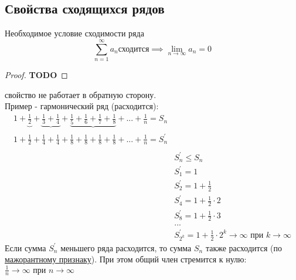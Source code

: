 \subsection{Свойства сходящихся рядов}
\begin{sv}
    \label{sv:neob}
    Необходимое условие сходимости ряда
    \begin{equation}
        \sum_{n=1}^{\infty} a_{n} \text{сходится}
        \implies \lim_{n\to\infty} a_{n} = 0
    \end{equation}

    \begin{proof}
        \color{YellowOrange}\textbf{TODO}
    \end{proof}

    \begin{remark}
        свойство не работает в обратную сторону. \\
        Пример - гармонический ряд (расходится): 
        \begin{equation}
            \begin{align*}
                1 
                + \underbrace{\frac{1}{2}}_{\text{}} 
                + \underbrace{\frac{1}{3} + \frac{1}{4}}_{\text{}} 
                + \underbrace{\frac{1}{5} + \frac{1}{6} + \frac{1}{7} + \frac{1}{8}}_{\text{}}
                + ... 
                + \frac{1}{n}
                = S_{n}
                \\
                1
                + \frac{1}{2}
                + \frac{1}{4} + \frac{1}{4}
                + \frac{1}{8} + \frac{1}{8} + \frac{1}{8} + \frac{1}{8}
                + ... 
                + \frac{1}{n}
                = S^{'}_{n}
                \\
                \\
                &S^{'}_{n} \leq S_{n}\\
                &S^{'}_{1} = 1\\
                &S^{'}_{2} = 1 + \frac{1}{2}\\
                &S^{'}_{4} = 1 + \frac{1}{2}\cdot 2\\
                &S^{'}_{8} = 1 + \frac{1}{2}\cdot 3\\
                &...
                \\
                &S^{'}_{2^{k}} = 1 + \frac{1}{2}\cdot 2^{k} \to\infty \text{ при } k\to\infty
            \end{align*}
        \end{equation}
        Если сумма \(S^{'}_{n}\) меньшего ряда расходится, то сумма \(S_{n}\) 
        также расходится (по \hyperlink{priz:maj}{мажорантному признаку}). 
        При этом общий член стремится к нулю:
        \( \frac{1}{n}\to\infty \text{ при } n\to\infty \)
    \end{remark}
\end{sv}

